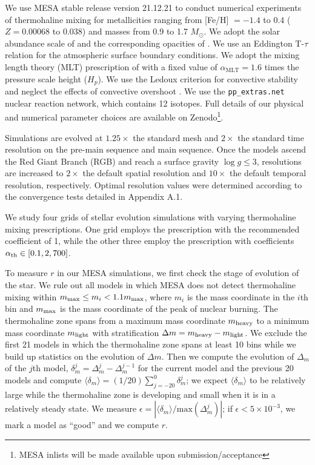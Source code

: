 We use MESA stable release version 21.12.21 to conduct numerical experiments of thermohaline mixing for metallicities ranging from [Fe/H] $= -1.4$ to $0.4$ ($Z = 0.00068$ to $0.038$) and masses from 0.9 to 1.7 $M_{\odot}$. We adopt the solar abundance scale of \citet{GrevesseSauval1998} and the corresponding opacities of \citet{IglesiasRogers1996}. We use an Eddington T-$\tau$ relation for the atmospheric surface boundary conditions.
We adopt the mixing length theory (MLT) prescription of \citet{Cox1980} with a fixed value of $\alpha_{\text{MLT}}= 1.6$ times the pressure scale height ($H_p$).  We use the Ledoux criterion for convective stability and neglect the effects of convective overshoot \citep{Ledoux}. We use the \verb|pp_extras.net| nuclear reaction network, which contains 12 isotopes. Full details of our physical and numerical parameter choices are available on Zenodo\footnote{MESA inlists will be made available upon submission/acceptance}. 

Simulations are evolved at $1.25\times$ the standard mesh and $2\times$ the standard time resolution on the pre-main sequence and main sequence. Once the models ascend the Red Giant Branch (RGB) and reach a surface gravity $\log g \le 3$, resolutions are increased to $2\times$ the default spatial resolution and $10\times$ the default temporal resolution, respectively. Optimal resolution values were determined according to the convergence tests detailed in Appendix A.1. 

We study four grids of stellar evolution simulations with varying thermohaline mixing prescriptions. One grid employs the \citet{brown_etal_2013} prescription with the recommended coefficient of 1, while the other three employ the \citet{kippenhahn_etal_1980} prescription with coefficients $\alpha_{\rm th} \in [0.1, 2, 700]$.


To measure $r$ in our MESA simulations, we first check the stage of evolution of the star.
We rule out all models in which MESA does not detect thermohaline mixing within $m_{\rm max} \leq m_i < 1.1 m_{\rm max}$, where $m_i$ is the mass coordinate in the $i$th bin and $m_{\rm max}$ is the mass coordinate of the peak of nuclear burning.
The thermohaline zone spans from a maximum mass coordinate $m_{\rm heavy}$ to a minimum mass coordinate $m_{\rm light}$ with stratification $\Delta m = m_{\rm heavy} - m_{\rm light}$.
We exclude the first 21 models in which the thermohaline zone spans at least 10 bins while we build up statistics on the evolution of $\Delta m$.
Then we compute the evolution of $\Delta_{m}$ of the $j$th model, $\delta_m^j = \Delta_m^{j} - \Delta_m^{j-1}$ for the current model and the previous 20 models and compute $\langle \delta_m \rangle = (1/20)\sum_{j=-20}^0 \delta_m^j$; we expect $\langle \delta_m \rangle$ to be relatively large while the thermohaline zone is developing and small when it is in a relatively steady state.
We measure $\epsilon = |\langle \delta_m \rangle / \mathrm{max}(\Delta_m^j)|$; if $\epsilon < 5 \times 10^{-3}$, we mark a model as ``good'' and we compute $r$.

